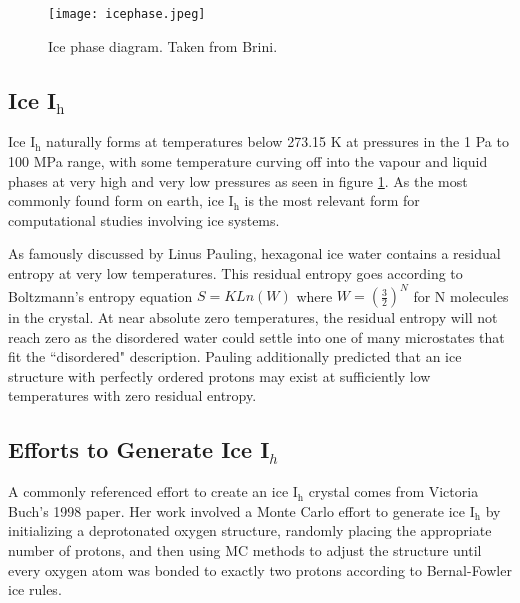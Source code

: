 \begin{figure}
	
	\centering
	
	\texttt{[image: icephase.jpeg]}
	
	\caption{Ice phase diagram. Taken from Brini. \cite{BriniWaterProperties}}
	
	\label{fig:icePhases}
	
\end{figure}

\subsection{Ice I$_{\mathrm{h}}$}

Ice I$_{\mathrm{h}}$ naturally forms at temperatures below 273.15 K at pressures in the 1 Pa to 100 MPa range, with some temperature curving off into the vapour and liquid phases at very high and very low pressures as seen in figure \ref{fig:icePhases}.
As the most commonly found form on earth, ice I$_{\mathrm{h}}$ is the most relevant form for computational studies involving ice systems.

As famously discussed by Linus Pauling, hexagonal ice water contains a residual entropy at very low temperatures.\cite{PaulingIce} 
This residual entropy goes according to Boltzmann's entropy equation $S=KLn(W)$ where $W=(\frac{3}{2})^{N}$ for N molecules in the crystal.
At near absolute zero temperatures, the residual entropy will not reach zero as the disordered water could settle into one of many microstates that fit the ``disordered" description.
Pauling additionally predicted that an ice structure with perfectly ordered protons may exist at sufficiently low temperatures with zero residual entropy.


\subsection{Efforts to Generate Ice I$_{h}$}


A commonly referenced effort to create an ice I$_{\mathrm{h}}$ crystal comes from Victoria Buch's 1998 paper. \cite{MCIce}
Her work involved a Monte Carlo effort to generate ice I$_{\mathrm{h}}$ by initializing a deprotonated oxygen structure, randomly placing the appropriate number of protons, and then using MC methods to adjust the structure until every oxygen atom was bonded to exactly two protons according to Bernal-Fowler ice rules.


